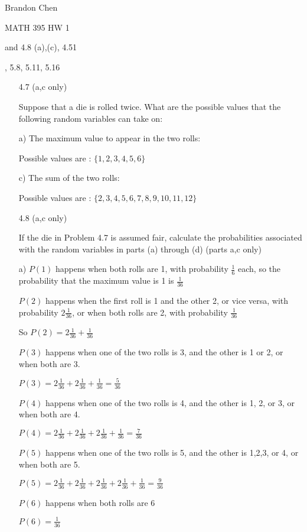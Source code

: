 \documentclass[11pt]{article}
\begin{document}
\noindent Brandon Chen

\noindent MATH 395 HW 1

 and 4.8 (a),(c), 4.51

, 5.8, 5.11, 5.16

\begin{itemize}
	\item[4.7 (a,c only)]

	Suppose that a die is rolled twice. What are the possible values that the following random variables can take on:

	a) The maximum value to appear in the two rolls:

	Possible values are : $\{1, 2, 3, 4, 5, 6\}$

	c) The sum of the two rolls:

	Possible values are : $\{2, 3, 4, 5, 6, 7, 8, 9, 10, 11, 12\}$

	\item[4.8 (a,c only)]

	If the die in Problem 4.7 is assumed fair, calculate the probabilities associated with the random variables in parts (a) through (d) (parts a,c only)

	a) $P(1)$ happens when both rolls are 1, with probability $\frac{1}{6}$ each, so the probability that the maximum value is 1 is $\frac{1}{36}$

	$P(2)$ happens when the first roll is 1 and the other 2, or vice versa, with probability $2 \frac{1}{36}$, or when both rolls are 2, with probability $\frac{1}{36}$

	So $P(2) = 2\frac{1}{36} + \frac{1}{36}$

	$P(3)$ happens when one of the two rolls is 3, and the other is 1 or 2, or when both are 3.

	$P(3) = 2\frac{1}{36} + 2\frac{1}{36} + \frac{1}{36} = \frac{5}{36}$

	$P(4)$ happens when one of the two rolls is 4, and the other is 1, 2, or 3, or when both are 4.

	$P(4) = 2\frac{1}{36} + 2\frac{1}{36} + 2\frac{1}{36} + \frac{1}{36} = \frac{7}{36}$

	$P(5)$ happens when one of the two rolls is 5, and the other is 1,2,3, or 4, or when both are 5.

	$P(5) = 2\frac{1}{36} + 2\frac{1}{36} + 2\frac{1}{36} + 2\frac{1}{36} + \frac{1}{36} = \frac{9}{36}$

	$P(6)$ happens when both rolls are 6

	$P(6) = \frac{1}{36}$


\end{itemize}
\end{document}
